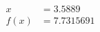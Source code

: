 \documentclass[preview]{standalone}
\begin{document}
\begin{align*}
x &= 3.5889\\f(x) &= 7.7315691
\end{align*}
\end{document}
